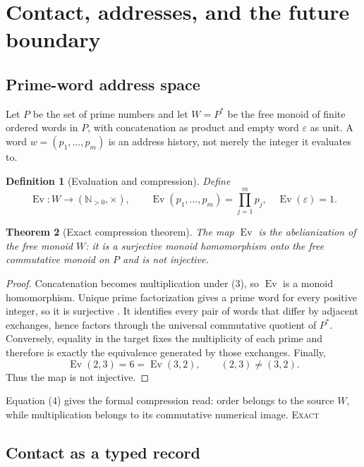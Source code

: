 \documentclass[10pt]{article}
\newtheorem{definition}{Definition}[section]
\newtheorem{theorem}[definition]{Theorem}
\theoremstyle{remark}
\newcommand{\Ev}{\operatorname{Ev}}
\newcommand{\N}{\mathbb N}
\newcommand{\cstatus}[1]{\hfill\textsc{#1}}
\newcommand{\exact}{\textsc{Exact}}
\begin{document}
\section{Contact, addresses, and the future boundary}

\subsection{Prime-word address space}

Let $P$ be the set of prime numbers and let $W=P^*$ be the free monoid of
finite ordered words in $P$, with concatenation as product and empty word
$\varepsilon$ as unit.  A word $w=(p_1,\ldots,p_m)$ is an address history,
not merely the integer it evaluates to.

\begin{definition}[Evaluation and compression]\label{def:ev}
Define
\[
 \Ev:W\longrightarrow(\N_{>0},\times),\qquad
 \Ev(p_1,\ldots,p_m)=\prod_{j=1}^{m}p_j,
 \quad \Ev(\varepsilon)=1.
\tag{3}
\]
\end{definition}

\begin{theorem}[Exact compression theorem]\label{thm:ev}
The map $\Ev$ is the abelianization of the free monoid $W$: it is a
surjective monoid homomorphism onto the free commutative monoid on $P$ and is
not injective.
\end{theorem}

\begin{proof}
Concatenation becomes multiplication under (3), so $\Ev$ is a monoid
homomorphism.  Unique prime factorization gives a prime word for every
positive integer, so it is surjective \cite{gauss1801}.  It identifies every pair of words
that differ by adjacent exchanges, hence factors through the universal
commutative quotient of $P^*$.  Conversely, equality in the target fixes the
multiplicity of each prime and therefore is exactly the equivalence generated
by those exchanges.  Finally,
\[
 \Ev(2,3)=6=\Ev(3,2),\qquad (2,3)\ne(3,2).
\tag{4}
\]
Thus the map is not injective.
\end{proof}

Equation (4) gives the formal compression read: order belongs to the source
$W$, while multiplication belongs to its commutative numerical image.
\cstatus{\exact}

\subsection{Contact as a typed record}
\end{document}
